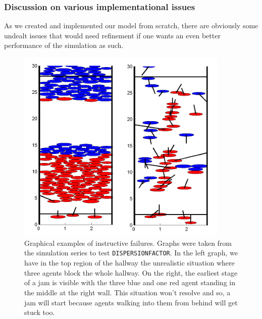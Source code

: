 \subsubsection{Discussion on various implementational issues}
As we created and implemented our model from scratch, there are obviously some undealt issues that would need refinement if one wants an even better performance of the simulation as such.\\

\begin{figure}[h!]
	\centering
		\includegraphics[width=0.90\textwidth]{pictures/exFails}
	\caption{Graphical examples of instructive failures. Graphs were taken from the simulation series to test \texttt{DISPERSIONFACTOR}. In the left graph, we have in the top region of the hallway the unrealistic situation where three agents block the whole hallway. On the right, the earliest stage of a jam is visible with the three blue and one red agent standing in the middle at the right wall. This situation won't resolve and so, a jam will start because agents walking into them from behind will get stuck too.}
	\label{fig:exFails}
\end{figure}

